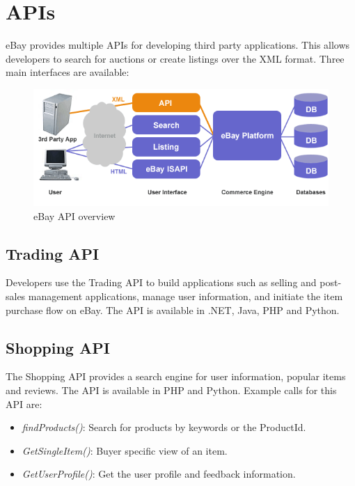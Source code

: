 \section{APIs}
eBay provides multiple APIs for developing third party applications. This allows developers to search for auctions or create listings over the XML format. Three main interfaces are available:
\begin{figure}[h!]
\centering
\includegraphics[scale=0.5]{images/api-flow.png}
\caption{eBay API overview}
\label{ebayAPI}
\end{figure}

\subsection{Trading API}
Developers use the Trading API to build applications such as selling and post-sales management applications, manage user information, and initiate the item purchase flow on eBay. The API is available in .NET, Java, PHP and Python.

\subsection{Shopping API}
The Shopping API provides a search engine for user information, popular items and reviews. The API is available in PHP and Python. Example calls for this API are:
\begin{itemize}
	\item \textit{findProducts()}: Search for products by keywords or the ProductId.
	\item \textit{GetSingleItem()}: Buyer specific view of an item.
	\item \textit{GetUserProfile()}: Get the user profile and feedback information.
\end{itemize}

